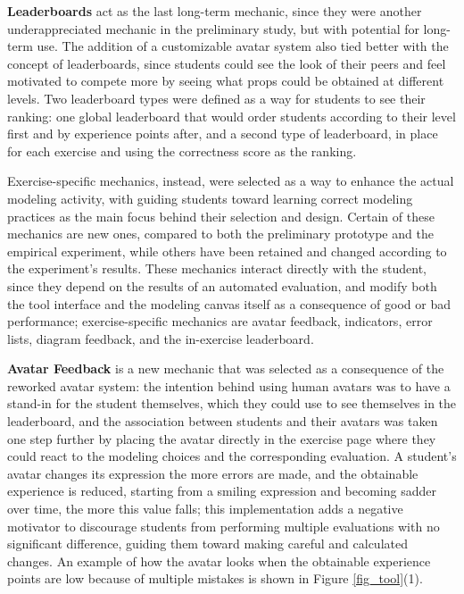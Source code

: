 \textbf{Leaderboards} act as the last long-term mechanic, since they were another underappreciated mechanic in the preliminary study, but with potential for long-term use. The addition of a customizable avatar system also tied better with the concept of leaderboards, since students could see the look of their peers and feel motivated to compete more by seeing what props could be obtained at different levels. Two leaderboard types were defined as a way for students to see their ranking: one global leaderboard that would order students according to their level first and by experience points after, and a second type of leaderboard, in place for each exercise and using the correctness score as the ranking.


Exercise-specific mechanics, instead, were selected as a way to enhance the actual modeling activity, with guiding students toward learning correct modeling practices as the main focus behind their selection and design. Certain of these mechanics are new ones, compared to both the preliminary prototype and the empirical experiment, while others have been retained and changed according to the experiment's results. These mechanics interact directly with the student, since they depend on the results of an automated evaluation, and modify both the tool interface and the modeling canvas itself as a consequence of good or bad performance; exercise-specific mechanics are avatar feedback, indicators, error lists, diagram feedback, and the in-exercise leaderboard. 

\textbf{Avatar Feedback} is a new mechanic that was selected as a consequence of the reworked avatar system: the intention behind using human avatars was to have a stand-in for the student themselves, which they could use to see themselves in the leaderboard, and the association between students and their avatars was taken one step further by placing the avatar directly in the exercise page where they could react to the modeling choices and the corresponding evaluation. A student's avatar changes its expression the more errors are made, and the obtainable experience is reduced, starting from a smiling expression and becoming sadder over time, the more this value falls; this implementation adds a negative motivator to discourage students from performing multiple evaluations with no significant difference, guiding them toward making careful and calculated changes. An example of how the avatar looks when the obtainable experience points are low because of multiple mistakes is shown in Figure \ref{fig_tool}(1).

